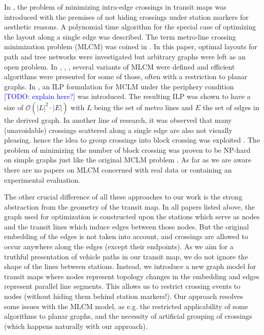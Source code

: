 \documentclass{llncs}
\newcommand\todo[1]{\textcolor{blue}{[TODO: #1]}}
\begin{document}
In \cite{ben06}, the problem of minimizing intra-edge crossings in transit maps was introduced with the premises of not hiding crossings under station markers for aesthetic reasons. A polynomial time algorithm for the special case of optimizing the layout along a single edge was described. The term metro-line crossing minimization problem (MLCM) was coined in \cite{bek07}. In this paper, optimal layouts for path and tree networks were investigated but arbitrary graphs were left as an open problem. In \cite{arg08}, \cite{nol09}, \cite{arg10}, several variants of MLCM were defined and efficient algorithms were presented for some of those, often with a restriction to planar graphs. In \cite{asq08}, an ILP formulation for MCLM under the periphery condition \todo{explain here?} was introduced. The resulting ILP was shown to have a size of $\mathcal{O}(|L|^2 \cdot |E|)$ with $L$ being the set of metro lines and $E$ the set of edges in the derived graph. In another line of research, it was observed that many (unavoidable) crossings scattered along a single edge are also not visually pleasing, hence the idea to group crossings into block crossing was exploited \cite{fin13b}. The problem of minimizing the number of block crossing was proven to be NP-hard on simple graphs just like the original MCLM problem \cite{fin13a}. As far as we are aware there are no papers on MLCM concerned with real data or containing an experimental evaluation.

The other crucial difference of all these approaches to our work is the strong abstraction from the geometry of the transit map. In all papers listed above, the graph used for optimization is constructed upon the stations which serve as nodes and the transit lines which induce edges between those nodes. But the original embedding of the edges is not taken into account, and crossings are allowed to occur anywhere along the edges (except their endpoints). As we aim for a truthful presentation of vehicle paths in our transit map, we do not ignore the shape of the lines between stations.  Instead, we introduce a new graph model for transit maps where nodes represent topology changes in the embedding and edges represent parallel line segments. This allows us to restrict crossing events to nodes (without hiding them behind station markers!). Our approach resolves some issues with the MLCM model, as e.g. the restricted applicability of some algorithms to planar graphs, and the necessity of artificial grouping of crossings (which happens naturally with our approach).
\end{document}
